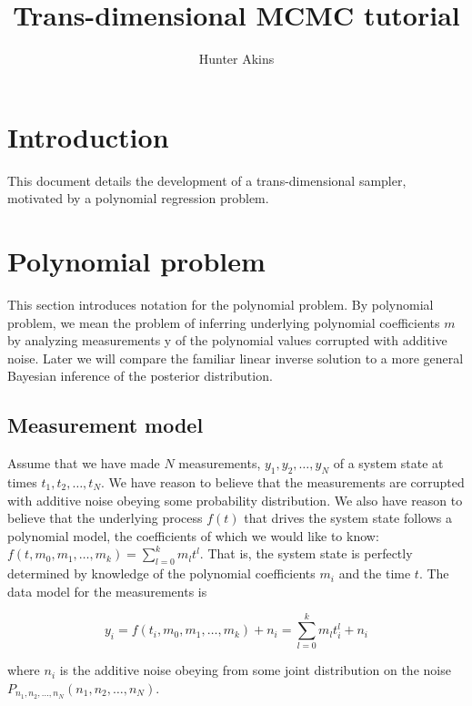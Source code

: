 \documentclass[11pt]{article}
\title{
	Trans-dimensional MCMC tutorial
}
\author{
	Hunter Akins
}
\begin{document}
	
	\maketitle

\tableofcontents
\clearpage


\section{Introduction}

This document details the development of a trans-dimensional sampler, motivated by a polynomial regression problem.

\section{Polynomial problem}

This section introduces notation for the polynomial problem. By polynomial problem, we mean the problem of inferring underlying polynomial coefficients $m$ by analyzing measurements y of the polynomial values corrupted with additive noise. Later we will compare the familiar linear inverse solution to a more general Bayesian inference of the posterior distribution.

\subsection{Measurement model}

Assume that we have made $N$ measurements, $y_{1}, y_{2}, \ldots, y_{N}$ of a system state at times $t_{1}, t_{2}, \ldots, t_{N}$. We have reason to believe that the measurements are corrupted with additive noise obeying some probability distribution. We also have reason to believe that the underlying process $f(t)$ that drives the system state follows a polynomial model, the coefficients of which we would like to know: $f\left(t, m_{0}, m_{1}, \ldots, m_{k}\right)=\sum_{l=0}^{k} m_{l} t^{l}$. That is, the system state is perfectly determined by knowledge of the polynomial coefficients $m_{i}$ and the time $t$. The data model for the measurements is

\begin{equation}
y_{i}=f\left(t_{i}, m_{0}, m_{1}, \ldots, m_{k}\right)+n_{i}=\sum_{l=0}^{k} m_{l} t_{i}^{l}+n_{i}
\end{equation}

where $n_{i}$ is the additive noise obeying from some joint distribution on the noise $P_{n_{1}, n_{2}, \ldots, n_{N}}\left(n_{1}, n_{2}, \ldots, n_{N}\right)$.
\end{document}

